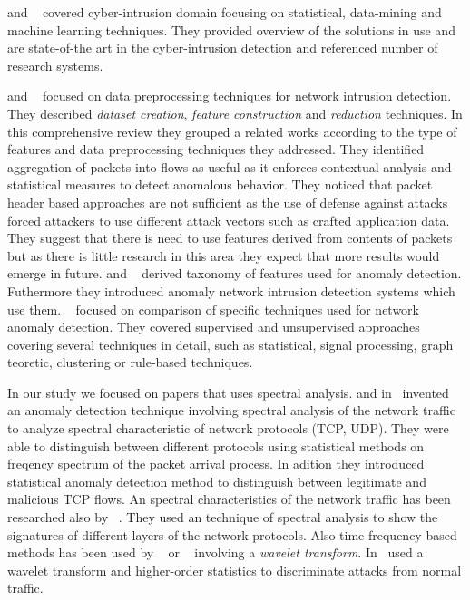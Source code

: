  and ~\cite{patcha2007anomaly} covered cyber-intrusion domain focusing on statistical,
data-mining and machine learning techniques. They provided overview of the solutions in use and are state-of-the 
art in the cyber-intrusion detection and referenced number of research systems.
%

 and ~\cite{davis2011data} focused on data preprocessing techniques for network
intrusion detection. They described \emph{dataset creation}, \emph{feature construction} and \emph{reduction}
techniques. 
In this comprehensive review they grouped a related works according to the type of features and
data preprocessing techniques they addressed. They identified aggregation of packets into flows as useful
as it enforces contextual analysis and statistical measures to detect anomalous behavior. They noticed that
packet header based approaches are not sufficient as the use of defense against attacks forced attackers 
to use different attack vectors such as crafted application data. They suggest that there is need to use 
features derived from contents of packets but as there is little research in this area they expect that
more results would emerge in future.
%
 and ~\cite{onut2007feature} derived taxonomy of features used for anomaly detection.
Futhermore they introduced anomaly network intrusion detection systems which use them.
%
~\cite{gogoi2011survey} focused on comparison of specific techniques used for network anomaly
detection. They covered supervised and unsupervised approaches covering several techniques in detail, such as
statistical, signal processing, graph teoretic, clustering  or rule-based techniques.

In our study we focused on papers that uses spectral analysis. 
 and  in~\cite{chen2007tcp,chen2007spectral}
invented an anomaly detection technique involving spectral analysis of the network traffic to analyze spectral 
characteristic of network protocols (TCP, UDP).
They were able to distinguish between different protocols using statistical methods on 
freqency spectrum of the packet arrival process. 
In adition they introduced statistical anomaly detection method to distinguish between 
legitimate and malicious TCP flows. 
An spectral characteristics of the network traffic has been researched also by
~\cite{he2004spectral}.
They used an technique of spectral analysis to show the signatures of different layers of the 
network protocols.
Also time-frequency based methods has been used by ~\cite{salagean2010real} or ~\cite{gao2006anomaly}
involving a \emph{wavelet transform}. In~\cite{salagean2010real}  used a wavelet transform and higher-order statistics
to discriminate attacks from normal traffic.

